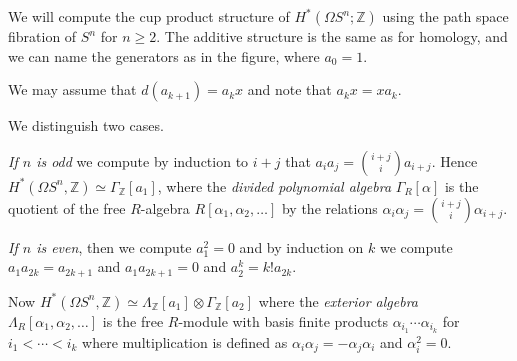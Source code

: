 \documentclass{article}
\newcommand{\mb}[1]{\mathbb{#1}}
\newcommand{\Z}{\mb{Z}}
\theoremstyle{definition}
\newenvironment{example}
  {\pushQED{\qed}\renewcommand{\qedsymbol}{$\triangle$}\examplex}
  {\popQED\endexamplex}
\theoremstyle{remark}
\begin{document}
\begin{example}
We will compute the cup product structure of $H^*(\Omega S^n;\Z)$ using the path space fibration of $S^n$ for $n\geq2$. The additive structure is the same as for homology, and we can name the generators as in the figure, where $a_0=1$.
\begin{center}
\end{center}
We may assume that $d(a_{k+1})=a_kx$ and note that $a_kx=xa_k$.

We distinguish two cases.

\emph{If $n$ is odd} we compute by induction to $i+j$ that $a_ia_j={i+j \choose i}a_{i+j}$. Hence $H^*(\Omega S^n,\Z)\simeq \Gamma_{\Z}[a_1]$, where the \emph{divided polynomial algebra} $\Gamma_R[\alpha]$ is the quotient of the free $R$-algebra $R[\alpha_1,\alpha_2,\ldots]$ by the relations $\alpha_i\alpha_j={i+j \choose i}\alpha_{i+j}$.

\emph{If $n$ is even}, then we compute $a_1^2=0$ and by induction on $k$ we compute $a_1a_{2k}=a_{2k+1}$ and $a_1a_{2k+1}=0$ and $a_2^k=k!a_{2k}$.


Now $H^*(\Omega S^n,\Z)\simeq \Lambda_\Z[a_1]\otimes \Gamma_\Z[a_2]$ where the \emph{exterior algebra} $\Lambda_R[\alpha_1,\alpha_2,\ldots]$ is the free $R$-module with basis finite products $\alpha_{i_1}\cdots\alpha_{i_k}$ for $i_1<\cdots<i_k$ where multiplication is defined as $\alpha_i\alpha_j=-\alpha_j\alpha_i$ and $\alpha_i^2=0$.
\end{example}
\end{document}
